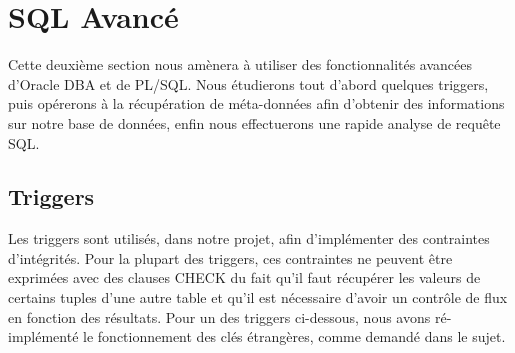 \documentclass[12pt,a4paper]{article}
\begin{document}
\section{SQL Avancé}
\label{sec.reference}

Cette deuxième section nous amènera à utiliser des fonctionnalités avancées
d’Oracle DBA et de PL/SQL. Nous étudierons tout d’abord quelques triggers, puis
opérerons à la récupération de méta-données afin d’obtenir des informations sur
notre base de données, enfin nous effectuerons une rapide analyse de requête
SQL.

\subsection{Triggers}
\label{sub.trig}

Les triggers sont utilisés, dans notre projet, afin d'implémenter des
contraintes d'intégrités. Pour la plupart des triggers, ces contraintes ne
peuvent être exprimées avec des clauses CHECK du fait qu’il faut  récupérer les
valeurs de certains tuples d’une autre table et qu’il est nécessaire d’avoir un
contrôle de flux en fonction des résultats. Pour un des triggers ci-dessous,
nous avons ré-implémenté le fonctionnement des clés étrangères, comme demandé
dans le sujet.
\end{document}

